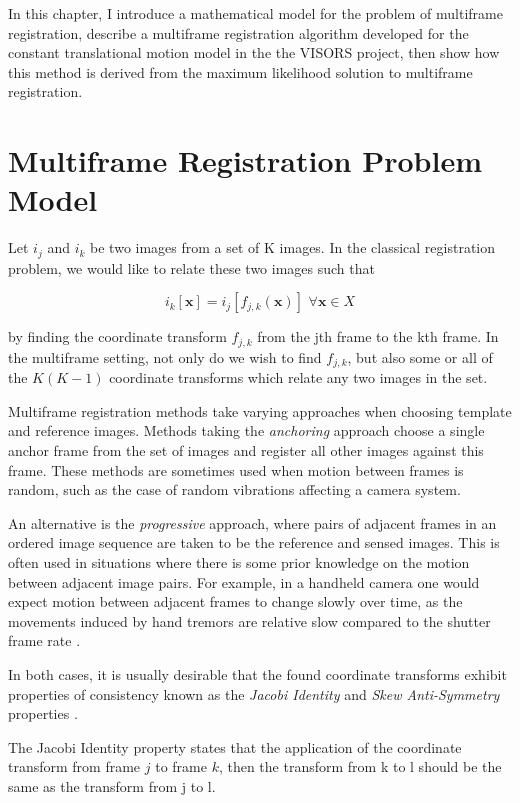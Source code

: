 \documentclass[tocnosub,noragright,centerchapter,12pt]{uiucecethesis09}
\begin{document}
In this chapter, I introduce a mathematical model for the problem of multiframe registration, describe a multiframe registration algorithm developed for the constant translational motion model in the the VISORS project, then show how this method is derived from the maximum likelihood solution to multiframe registration.

\section{Multiframe Registration Problem Model} \label{sec:model}

Let $i_j$ and $i_k$ be two images from a set of K images.  In the classical registration problem, we would like to relate these two images such that 

$$
i_k[\bm{x}] = i_j[f_{j,k}(\bm{x})] \,\, \forall \bm{x} \in X
$$

by finding the coordinate transform $f_{j,k}$ from the jth frame to the kth frame.  In the multiframe setting, not only do we wish to find $f_{j,k}$, but also some or all of the $K(K - 1)$ coordinate transforms which relate any two images in the set.

Multiframe registration methods take varying approaches when choosing template and reference images.  Methods taking the \emph{anchoring} approach choose a single anchor frame from the set of images and register all other images against this frame.  These methods are sometimes used when motion between frames is random, such as the case of random vibrations affecting a camera system.

An alternative is the \emph{progressive} approach, where pairs of adjacent frames in an ordered image sequence are taken to be the reference and sensed images.  This is often used in situations where there is some prior knowledge on the motion between adjacent image pairs.  For example, in a handheld camera one would expect motion between adjacent frames to change slowly over time, as the movements induced by hand tremors are relative slow compared to the shutter frame rate \cite{smoothing}.

In both cases, it is usually desirable that the found coordinate transforms exhibit properties of consistency known as the \emph{Jacobi Identity} and \emph{Skew Anti-Symmetry} properties \cite{farsiu2005}.

The Jacobi Identity property states that the application of the coordinate transform from frame $j$ to frame $k$, then the transform from k to l should be the same as the transform from j to l.
\end{document}
